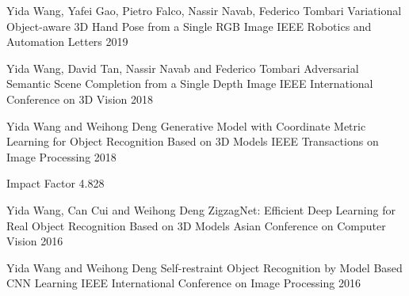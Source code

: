


\begin{cventries}

\cventry
{Yida Wang, Yafei Gao, Pietro Falco, Nassir Navab, Federico Tombari} %
{Variational Object-aware 3D Hand Pose from a Single RGB Image} %
{IEEE Robotics and Automation Letters} %
{2019} %
{ %
}

\cventry
{Yida Wang, David Tan, Nassir Navab and Federico Tombari} %
{Adversarial Semantic Scene Completion from a Single Depth Image} %
{IEEE International Conference on 3D Vision} %
{2018} %
{ %
}

\cventry
{Yida Wang and Weihong Deng} %
{Generative Model with Coordinate Metric Learning for Object Recognition Based on 3D Models} %
{IEEE Transactions on Image Processing} %
{2018} %
{ %
\begin{cvitems}
\item {Impact Factor 4.828}
\end{cvitems}
}


\cventry
{Yida Wang, Can Cui and Weihong Deng} %
{ZigzagNet: Efficient Deep Learning for Real Object Recognition Based on 3D Models} %
{Asian Conference on Computer Vision} %
{2016} %
{ %
}


\cventry
{Yida Wang and Weihong Deng} %
{Self-restraint Object Recognition by Model Based CNN Learning} %
{IEEE International Conference on Image Processing} %
{2016} %
{ %
}


\end{cventries}
